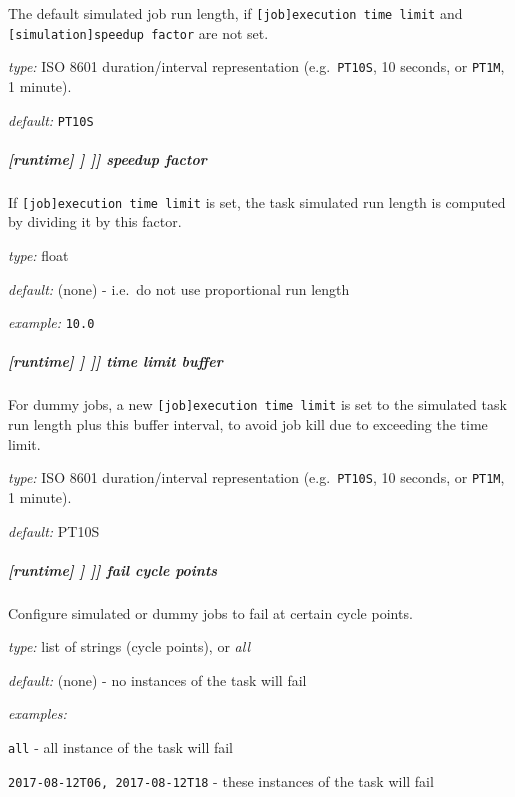 The default simulated job run length, if \lstinline=[job]execution time limit=
and \lstinline=[simulation]speedup factor= are not set.

\begin{myitemize}
    \item {\em type:} ISO 8601 duration/interval representation (e.g.\ 
 \lstinline=PT10S=, 10 seconds, or \lstinline=PT1M=, 1 minute).
    \item {\em default:} \lstinline=PT10S=
\end{myitemize}

\subparagraph[speedup factor]{[runtime] \textrightarrow [[\_\_NAME\_\_]] \textrightarrow [[[simulation]]] \textrightarrow speedup factor}

If \lstinline=[job]execution time limit= is set, the task simulated run length
is computed by dividing it by this factor.

\begin{myitemize}
    \item {\em type:} float
    \item {\em default:} (none) - i.e.\ do not use proportional run length
    \item {\em example:} \lstinline=10.0=
\end{myitemize}

\subparagraph[time limit buffer]{[runtime] \textrightarrow [[\_\_NAME\_\_]] \textrightarrow [[[simulation]]] \textrightarrow time limit buffer}

For dummy jobs, a new \lstinline=[job]execution time limit= is set to the
simulated task run length plus this buffer interval, to avoid job kill due to
exceeding the time limit.

\begin{myitemize}
    \item {\em type:} ISO 8601 duration/interval representation (e.g.\ 
 \lstinline=PT10S=, 10 seconds, or \lstinline=PT1M=, 1 minute).
    \item {\em default:} PT10S
\end{myitemize}

\subparagraph[fail cycle points]{[runtime] \textrightarrow [[\_\_NAME\_\_]] \textrightarrow [[[simulation]]] \textrightarrow fail cycle points}

Configure simulated or dummy jobs to fail at certain cycle points.

\begin{myitemize}
    \item {\em type:} list of strings (cycle points), or {\em all}
    \item {\em default:} (none) - no instances of the task will fail
    \item {\em examples:}
    \begin{myitemize}
        \item \lstinline=all= - all instance of the task will fail
        \item \lstinline=2017-08-12T06, 2017-08-12T18= - these instances of the
        task will fail
    \end{myitemize}
\end{myitemize}

